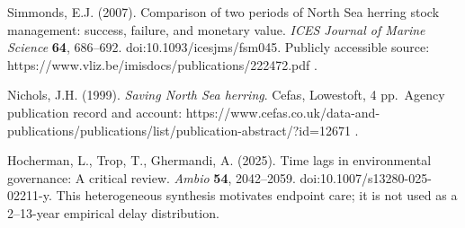 \documentclass[
  10pt,
  a4paper,
]{article}
\begin{document}
Simmonds, E.J. (2007). Comparison of two periods of North Sea herring
stock management: success, failure, and monetary value. \emph{ICES
Journal of Marine Science} \textbf{64}, 686--692.
doi:10.1093/icesjms/fsm045. Publicly accessible source:
https://www.vliz.be/imisdocs/publications/222472.pdf .

Nichols, J.H. (1999). \emph{Saving North Sea herring}. Cefas, Lowestoft,
4 pp.~Agency publication record and account:
https://www.cefas.co.uk/data-and-publications/publications/list/publication-abstract/?id=12671
.

Hocherman, L., Trop, T., Ghermandi, A. (2025). Time lags in
environmental governance: A critical review. \emph{Ambio} \textbf{54},
2042--2059. doi:10.1007/s13280-025-02211-y. This heterogeneous synthesis
motivates endpoint care; it is not used as a 2--13-year empirical delay
distribution.
\end{document}
